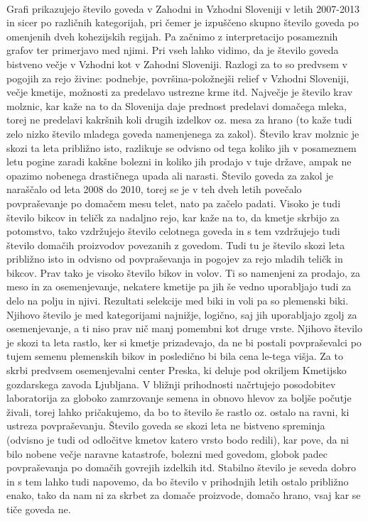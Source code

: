 \documentclass[11pt,a4paper]{article}
\begin{document}
\begin{center}
\\
\end{center}
Grafi prikazujejo število goveda v Zahodni in Vzhodni Sloveniji v letih 2007-2013 in sicer po različnih kategorijah, pri čemer je izpuščeno skupno število goveda po omenjenih dveh kohezijskih regijah. Pa začnimo z interpretacijo posameznih grafov ter primerjavo med njimi. Pri vseh lahko vidimo, da je število goveda bistveno večje v Vzhodni kot v Zahodni Sloveniji. Razlogi za to so predvsem v pogojih za rejo živine: podnebje, površina-položnejši relief v Vzhodni Sloveniji, večje kmetije, možnosti za predelavo ustrezne krme itd.
\newline
Največje je število krav molznic, kar kaže na to da Slovenija daje prednost predelavi domačega mleka, torej ne predelavi kakršnih koli drugih izdelkov oz. mesa za hrano (to kaže tudi zelo nizko število mladega goveda namenjenega za zakol). Število krav molznic je skozi ta leta približno isto, razlikuje se odvisno od tega koliko jih v posameznem letu pogine zaradi kakšne bolezni in koliko jih prodajo v tuje države, ampak ne opazimo nobenega drastičnega upada ali narasti. Število goveda za zakol je naraščalo od leta 2008 do 2010, torej se je v teh dveh letih povečalo povpraševanje po domačem mesu telet, nato pa začelo padati.
\newline
Visoko je tudi število bikcov in teličk za nadaljno rejo, kar kaže na to, da kmetje skrbijo za potomstvo, tako vzdržujejo število celotnega goveda in s tem vzdržujejo tudi število domačih proizvodov povezanih z govedom. Tudi tu je število skozi leta približno isto in odvisno od povpraševanja in pogojev za rejo mladih teličk in bikcov.
\newline
Prav tako je visoko število bikov in volov. Ti so namenjeni za prodajo, za meso in za osemenjevanje, nekatere kmetije pa jih še vedno uporabljajo tudi za delo na polju in njivi. 
\newline
Rezultati selekcije med biki in voli pa so plemenski biki. Njihovo število je med kategorijami najnižje, logično, saj jih uporabljajo zgolj za osemenjevanje, a ti niso prav nič manj pomembni kot druge vrste. Njihovo število je skozi ta leta rastlo, ker si kmetje prizadevajo, da ne bi postali povpraševalci po tujem semenu plemenskih bikov in posledično bi bila cena le-tega višja. Za to skrbi predvsem osemenjevalni center Preska, ki deluje pod okriljem Kmetijsko gozdarskega zavoda Ljubljana. V bližnji prihodnosti načrtujejo posodobitev laboratorija za globoko zamrzovanje semena in obnovo hlevov za boljše počutje živali, torej lahko pričakujemo, da bo to število še rastlo oz. ostalo na ravni, ki ustreza povpraševanju.
\newline
Število goveda se skozi leta ne bistveno spreminja (odvisno je tudi od odločitve kmetov katero vrsto bodo redili), kar pove, da ni bilo nobene večje naravne katastrofe, bolezni med govedom, globok padec povpraševanja po domačih govrejih izdelkih itd. Stabilno število je seveda dobro in s tem lahko tudi napovemo, da bo število v prihodnjih letih ostalo približno enako, tako da nam ni za skrbet za domače proizvode, domačo hrano, vsaj kar se tiče goveda ne.
\end{document}
